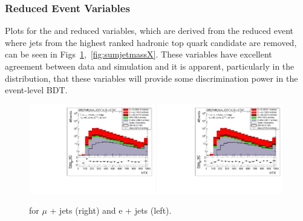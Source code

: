 \subsubsection*{Reduced Event Variables}


Plots for the \HTX and \sumjetmassX reduced variables, which are derived from the reduced event where jets from the highest ranked hadronic top quark candidate are removed, can be seen in Figs~\ref{fig:HTX},~\ref{fig:sumjetmassX}. These variables have excellent agreement between data and simulation and it is apparent, particularly in the \HTX distribution, that these variables will provide some discrimination power in the event-level BDT.

\begin{figure}[!ht]
    \includegraphics[width=0.49\textwidth]{images/Run1/HTX_StackLogY_Mu.pdf}
    \includegraphics[width=0.49\textwidth]{images/Run1/HTX_StackLogY_e.pdf}
    \caption{\HTX for $\mu$ + jets (right) and e + jets (left).}
    \label{fig:HTX}
\end{figure}

